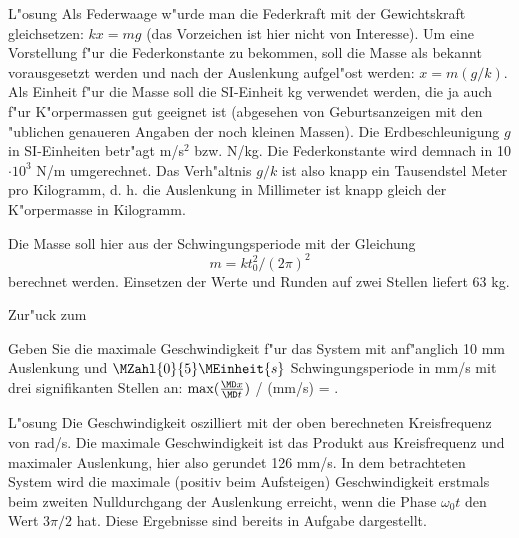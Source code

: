 \begin{MExercises}
\begin{MExercise}
\begin{MHint}{L"osung} 
Als Federwaage w"urde man die Federkraft mit der Gewichtskraft gleichsetzen: $k x=m g$ (das Vorzeichen ist hier nicht von Interesse). Um eine Vorstellung f"ur die Federkonstante zu bekommen, soll die Masse als bekannt vorausgesetzt werden und nach der Auslenkung aufgel"ost werden: $x=m(g/k)$. Als Einheit f"ur die Masse soll die SI-Einheit kg verwendet werden, die ja auch f"ur K"orpermassen gut geeignet ist (abgesehen von Geburtsanzeigen mit den "ublichen genaueren Angaben der noch kleinen Massen). Die Erdbeschleunigung $g$ in SI-Einheiten betr"agt  m/s$^2$ bzw. N/kg. Die Federkonstante wird demnach in 10$\cdot 10^3$ N/m umgerechnet. Das Verh"altnis $g/k$ ist also knapp ein Tausendstel Meter pro Kilogramm, d. h. die Auslenkung in Millimeter ist knapp gleich der K"orpermasse in Kilogramm.

Die Masse soll hier aus der Schwingungsperiode mit der Gleichung
\begin{equation}
  m=k t_0^2/(2\pi)^2
\end{equation}
berechnet werden. Einsetzen der Werte und Runden auf zwei Stellen liefert 63 kg.

\end{MHint}

Zur"uck zum 
\end{MExercise}

\begin{MExercise}
Geben Sie die maximale Geschwindigkeit f"ur das System 
mit anf"anglich 10 mm Auslenkung 
und $\MZahl{0}{5}\MEinheit{s}$ Schwingungsperiode in mm/s mit drei signifikanten Stellen an: $\max (\frac{\MD x }{\MD t})$ / (mm/s) =  .

\begin{MHint}{L"osung} 
Die Geschwindigkeit oszilliert mit der oben berechneten Kreisfrequenz von  rad/s. Die maximale Geschwindigkeit ist das Produkt aus Kreisfrequenz und maximaler Auslenkung, hier also gerundet 126 mm/s. In dem betrachteten System wird die maximale (positiv beim Aufsteigen) Geschwindigkeit erstmals beim zweiten Nulldurchgang der Auslenkung erreicht, wenn die Phase $\omega_0 t$ den Wert $3\pi/2$ hat. Diese Ergebnisse sind bereits in Aufgabe  dargestellt.
\end{MHint}



\end{MExercise}
\end{MExercises}
